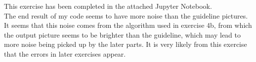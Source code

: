 This exercise has been completed in the attached Jupyter Notebook.\\
The end result of my code seems to have more noise than the guideline pictures. It seems that this noise comes from the algorithm used in exercise 4b, from which the output picture seems to be brighter than the guideline, which may lead to more noise being picked up by the later parts. It is very likely from this exercise that the errors in later exercises appear.